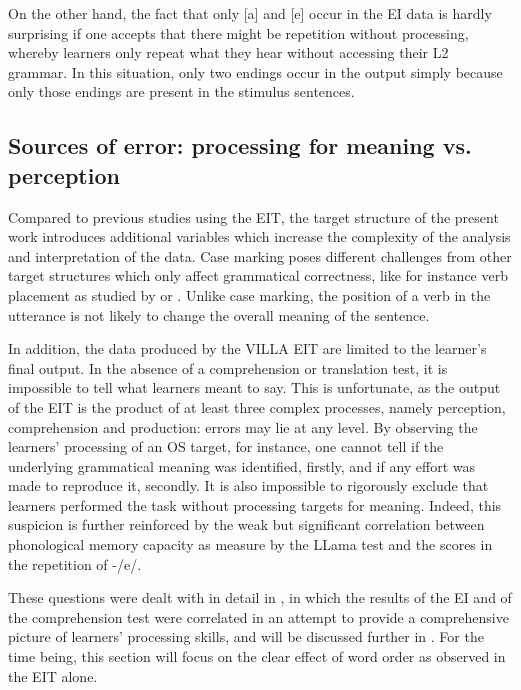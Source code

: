 On the other hand, the fact that only [a] and [e] occur in the EI data is hardly surprising if one accepts that there might be repetition without processing, whereby learners only repeat what they hear without accessing their L2 grammar. In this situation, only two endings occur in the output simply because only those endings are present in the stimulus sentences.

\subsection{Sources of error: processing for meaning vs. perception}\label{sec:08:2.2}

Compared to previous studies using the EIT, the target structure of the present work introduces additional variables which increase the complexity of the analysis and interpretation of the data. Case marking poses different challenges from other target structures which only affect grammatical correctness, like for instance verb placement as studied by \citet{Håkansson1989} or \citet{Schimke2011}. Unlike case marking, the position of a verb in the utterance is not likely to change the overall meaning of the sentence. 

In addition, the data produced by the VILLA EIT are limited to the learner’s final output. In the absence of a comprehension or translation test, it is impossible to tell what learners meant to say. This is unfortunate, as the output of the EIT is the product of at least three complex processes, namely perception, comprehension and production: errors may lie at any level. By observing the learners’ processing of an OS target, for instance, one cannot tell if the underlying grammatical meaning was identified, firstly, and if any effort was made to reproduce it, secondly. It is also impossible to rigorously exclude that learners performed the task without processing targets for meaning. Indeed, this suspicion is further reinforced by the weak but significant correlation between phonological memory capacity as measure by the LLama test and the scores in the repetition of -/e/.

These questions were dealt with in detail in , in which the results of the EI and of the comprehension test were correlated in an attempt to provide a comprehensive picture of learners’ processing skills, and will be discussed further in . For the time being, this section will focus on the clear effect of word order as observed in the EIT alone.

